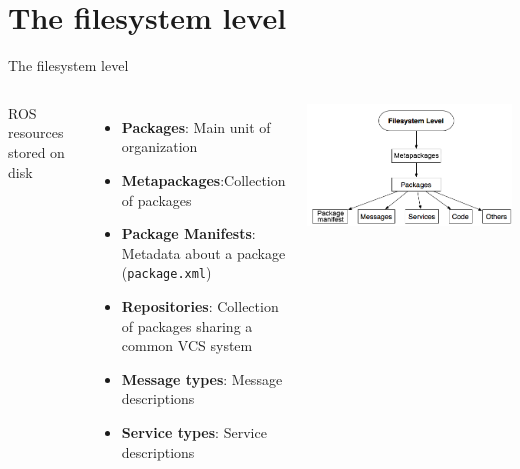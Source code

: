 \documentclass[10pt,compress]{beamer} %
\begin{document}
\section{The filesystem level}
\begin{frame}{The filesystem level}
    \begin{columns}
	   \small{
		ROS resources stored on disk
  		\begin{itemize}
			\item \textbf{Packages}: Main unit of organization
			\item \textbf{Metapackages}:Collection of packages
			\item \textbf{Package Manifests}: Metadata about a package (\texttt{package.xml})
			\item \textbf{Repositories}: Collection of packages sharing a common VCS system
			\item \textbf{Message types}: Message descriptions
			\item \textbf{Service types}: Service descriptions
		\end{itemize}
		}
			\centering\includegraphics[width=\linewidth]{figs/filesystem.png}
	\end{columns}

\end{frame}
\end{document}
